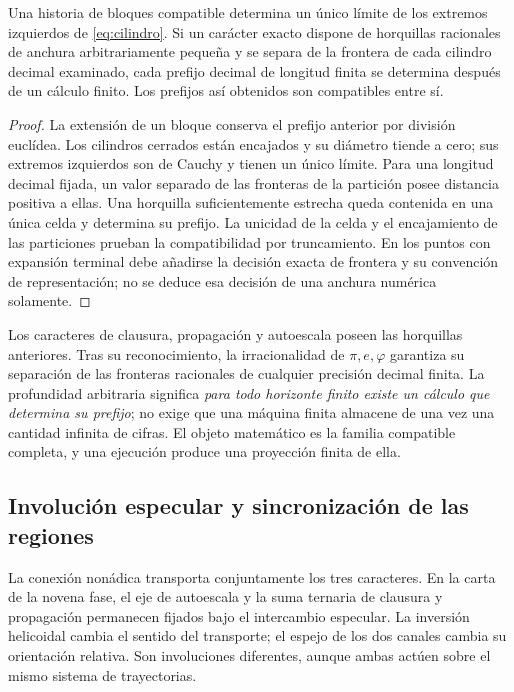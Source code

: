 \begin{theorem}
Una historia de bloques compatible determina un único límite de los extremos izquierdos de \eqref{eq:cilindro}. Si un carácter exacto dispone de horquillas racionales de anchura arbitrariamente pequeña y se separa de la frontera de cada cilindro decimal examinado, cada prefijo decimal de longitud finita se determina después de un cálculo finito. Los prefijos así obtenidos son compatibles entre sí.
\end{theorem}
\begin{proof}
La extensión de un bloque conserva el prefijo anterior por división euclídea. Los cilindros cerrados están encajados y su diámetro tiende a cero; sus extremos izquierdos son de Cauchy y tienen un único límite. Para una longitud decimal fijada, un valor separado de las fronteras de la partición posee distancia positiva a ellas. Una horquilla suficientemente estrecha queda contenida en una única celda y determina su prefijo. La unicidad de la celda y el encajamiento de las particiones prueban la compatibilidad por truncamiento. En los puntos con expansión terminal debe añadirse la decisión exacta de frontera y su convención de representación; no se deduce esa decisión de una anchura numérica solamente.
\end{proof}

Los caracteres de clausura, propagación y autoescala poseen las horquillas anteriores. Tras su reconocimiento, la irracionalidad de \(\pi,e,\varphi\) garantiza su separación de las fronteras racionales de cualquier precisión decimal finita. La profundidad arbitraria significa \emph{para todo horizonte finito existe un cálculo que determina su prefijo}; no exige que una máquina finita almacene de una vez una cantidad infinita de cifras. El objeto matemático es la familia compatible completa, y una ejecución produce una proyección finita de ella.

\subsection{Involución especular y sincronización de las regiones}

La conexión nonádica transporta conjuntamente los tres caracteres. En la carta de la novena fase, el eje de autoescala y la suma ternaria de clausura y propagación permanecen fijados bajo el intercambio especular. La inversión helicoidal cambia el sentido del transporte; el espejo de los dos canales cambia su orientación relativa. Son involuciones diferentes, aunque ambas actúen sobre el mismo sistema de trayectorias.

